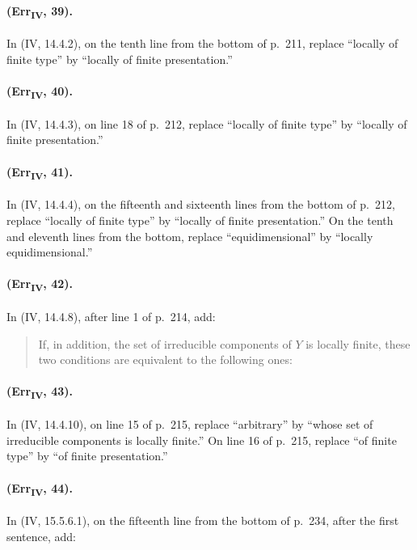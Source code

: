 \paragraph{(Err\textsubscript{IV}, 39).}
In (IV, 14.4.2), on the tenth line from the bottom of p.~211, replace
``locally of finite type'' by ``locally of finite presentation.''

\paragraph{(Err\textsubscript{IV}, 40).}
In (IV, 14.4.3), on line 18 of p.~212, replace ``locally of finite type''
by ``locally of finite presentation.''

\paragraph{(Err\textsubscript{IV}, 41).}
In (IV, 14.4.4), on the fifteenth and sixteenth lines from the bottom of
p.~212, replace ``locally of finite type'' by ``locally of finite
presentation.''  On the tenth and eleventh lines from the bottom,
replace ``equidimensional'' by ``locally equidimensional.''

\paragraph{(Err\textsubscript{IV}, 42).}
In (IV, 14.4.8), after line 1 of p.~214, add:
\begin{quote}
If, in addition, the set of irreducible components of $Y$ is locally
finite, these two conditions are equivalent to the following ones:
\end{quote}

\paragraph{(Err\textsubscript{IV}, 43).}
In (IV, 14.4.10), on line 15 of p.~215, replace ``arbitrary'' by ``whose
set of irreducible components is locally finite.''  On line 16 of
p.~215, replace ``of finite type'' by ``of finite presentation.''

\paragraph{(Err\textsubscript{IV}, 44).}
In (IV, 15.5.6.1), on the fifteenth line from the bottom of p.~234,
after the first sentence, add:

